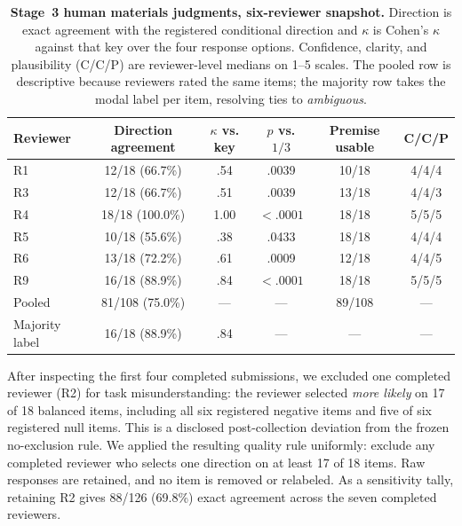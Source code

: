 \begin{table}[t]
\centering
\small
\caption{\textbf{Stage~3 human materials judgments, six-reviewer snapshot.}
Direction is exact agreement with the registered conditional direction and
$\kappa$ is Cohen's $\kappa$ against that key over the four response options.
Confidence, clarity, and plausibility (C/C/P) are reviewer-level medians on 1--5
scales. The pooled row is descriptive because reviewers rated the same items; the
majority row takes the modal label per item, resolving ties to \emph{ambiguous}.}
\label{tab:stage3-human}
\begin{tabular}{lccccc}
\toprule
Reviewer & Direction agreement & $\kappa$ vs. key & $p$ vs. $1/3$ & Premise usable & C/C/P \\
\midrule
R1 & 12/18 (66.7\%) & .54 & .0039 & 10/18 & 4/4/4 \\
R3 & 12/18 (66.7\%) & .51 & .0039 & 13/18 & 4/4/3 \\
R4 & 18/18 (100.0\%) & 1.00 & $<.0001$ & 18/18 & 5/5/5 \\
R5 & 10/18 (55.6\%) & .38 & .0433 & 18/18 & 4/4/4 \\
R6 & 13/18 (72.2\%) & .61 & .0009 & 12/18 & 4/4/5 \\
R9 & 16/18 (88.9\%) & .84 & $<.0001$ & 18/18 & 5/5/5 \\
\midrule
Pooled & 81/108 (75.0\%) & --- & --- & 89/108 & --- \\
Majority label & 16/18 (88.9\%) & .84 & --- & --- & --- \\
\bottomrule
\end{tabular}
\end{table}

\begin{table}[t]
\centering
\small
\caption{\textbf{Model agreement on the same 18 Stage~3 packets.} A model's
direction label is its mean signed revision for that packet, thresholded at the
$3$~pp used for EHC and HFC. $\kappa$ is Cohen's $\kappa$ over the four response
options, taken against the registered key and against the majority reviewer label.
Claude Opus~4.8 covers 12 of 18 packets. Regenerate with
\protect{}.}
\label{tab:stage3-model-agreement}

\end{table}

After inspecting the first four completed submissions, we excluded one completed
reviewer (R2) for task misunderstanding: the reviewer selected \emph{more
likely} on 17 of 18 balanced items, including all six registered negative items
and five of six registered null items. This is a disclosed post-collection
deviation from the frozen no-exclusion rule. We applied the resulting quality
rule uniformly: exclude any completed reviewer who selects one direction on at
least 17 of 18 items. Raw responses are retained, and no item is removed or
relabeled. As a sensitivity tally, retaining R2 gives 88/126 (69.8\%) exact
agreement across the seven completed reviewers.

